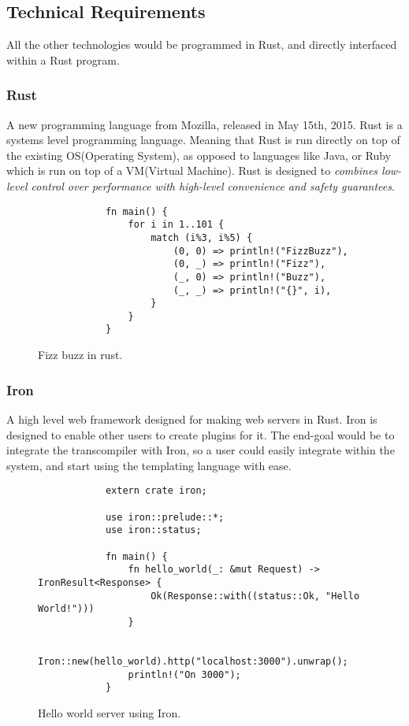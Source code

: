 \documentclass[draft]{report}
\begin{document}
\subsection{Technical Requirements}
All the other technologies would be programmed in Rust, and directly interfaced 
within a Rust program.

\subsubsection{Rust} 
A new programming language from Mozilla, released in May 15th, 2015.\cite{Rust}
Rust is a systems level programming language. Meaning that Rust is run directly on top of the existing
OS(Operating System), as opposed to languages like Java, or Ruby which is run on top of a VM(Virtual Machine).
Rust is designed to \textit{combines low-level control over performance with high-level convenience
and safety guarantees}\cite{Rust}.

\begin{figure}[ht!]
    \caption{Fizz buzz in rust.}
    \begin{verbatim}
            fn main() {
                for i in 1..101 {
                    match (i%3, i%5) {
                        (0, 0) => println!("FizzBuzz"),
                        (0, _) => println!("Fizz"),
                        (_, 0) => println!("Buzz"),
                        (_, _) => println!("{}", i),
                    }
                }
            }
    \end{verbatim}
\end{figure}

\subsubsection{Iron}
A high level web framework designed for making web servers in Rust.\cite{Iron}
Iron is designed to enable other users to create plugins for it. The end-goal would be to integrate
the transcompiler with Iron, so a user could easily integrate within the system, and start using the
templating language with ease.

\begin{figure}[ht!]
    \caption{Hello world server using Iron.}
    \begin{verbatim}
            extern crate iron;

            use iron::prelude::*;
            use iron::status;

            fn main() {
                fn hello_world(_: &mut Request) -> IronResult<Response> {
                    Ok(Response::with((status::Ok, "Hello World!")))
                }

                Iron::new(hello_world).http("localhost:3000").unwrap();
                println!("On 3000");
            }
    \end{verbatim}
\end{figure}
\end{document}
